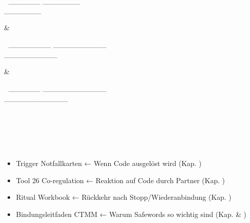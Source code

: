 \begin{longtable}
\begin{minipage}[t]{\linewidth}
\end{minipage} \\
\begin{minipage}[t]{\linewidth}\raggedright
📝 \_\_\_\_\_\_ \_\_\_\_\_\_\_\\
\textcolor{ctmmGreen}{\textit{\1}}\_\_\_\_\_\_\_\strut
\end{minipage} & \begin{minipage}[t]{\linewidth}\raggedright
📝 \_\_\_\_\_\_\_\_ \_\_\_\_\_\_\_\_\_\_\\
\textcolor{ctmmGreen}{\textit{\1}}\_\_\_\_\_\_\_\_\_\_\strut
\end{minipage} & \begin{minipage}[t]{\linewidth}\raggedright
📝 \_\_\_\_\_\_ \_\_\_\_\_\_\_\_\_\_\_\_\\
\textcolor{ctmmGreen}{\textit{\1}}\_\_\_\_\_\_\_\_\_\_\_\_\strut
\end{minipage} \\
\end{longtable}

\hfill\break
\hfill\break

\hypertarget{ctmm-navigation}{%
\subsection[🧭 \ul{\textbf{\textcolor{ctmmBlue}{\1}}}]{\texorpdfstring{\protect\hypertarget{ctmm-navigation}{}{}🧭 \ul{\textbf{\textcolor{ctmmBlue}{\1}}}}{🧭 CTMM-NAVIGATION}}\label{ctmm-navigation}}

\begin{itemize}[label=\textcolor{ctmmOrange}{\faArrowRight}]
\item
  Trigger Notfallkarten ← Wenn Code ausgelöst wird (Kap. \textbf{\textcolor{ctmmBlue}{\1}})
\item
  Tool 26 Co-regulation ← Reaktion auf Code durch Partner (Kap. \textbf{\textcolor{ctmmBlue}{\1}})
\item
  Ritual Workbook ← Rückkehr nach Stopp/Wiederanbindung (Kap. \textbf{\textcolor{ctmmBlue}{\1}})
\item
  Bindungsleitfaden CTMM ← Warum Safewords so wichtig sind (Kap. \textbf{\textcolor{ctmmBlue}{\1}} \& \textbf{\textcolor{ctmmBlue}{\1}})
\end{itemize}

\hfill\break
\hfill\break

📎 \textbf{\textcolor{ctmmBlue}{\1}}
